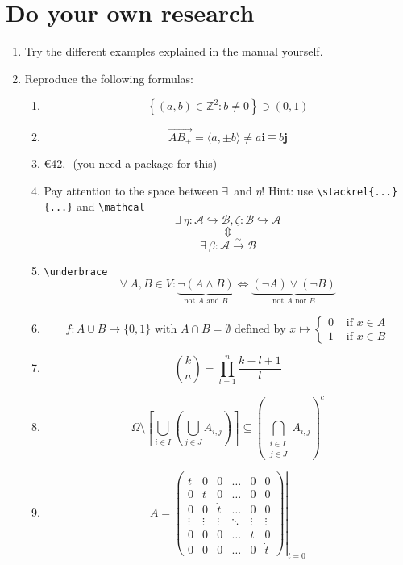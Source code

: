 \documentclass{article}
\begin{document}
\section{Do your own research}
\begin{enumerate}
	\item Try the different examples explained in the manual yourself.
	\item Reproduce the following formulas:
	\begin{enumerate}
		\item \[  \left\{(a,b) \in \mathbb{Z}^2 : b \neq 0\right\} \ni (0,1) \]
		\item \[\overrightarrow{AB_{\pm}} = \langle a, \pm b \rangle \neq a\mathbf{i} \mp b\mathbf{j}\]
		\item \euro 42,- (you need a package for this)
		\item Pay attention to the space between \textquotesingle\(\exists\)\textquotesingle \ and \textquotesingle\(\eta\)\textquotesingle! Hint: use \verb|\stackrel{...}{...}| and \verb.\mathcal.
			\[\exists \ \eta :\mathcal{A} \hookrightarrow \mathcal{B}, \zeta : \mathcal{B} \hookrightarrow \mathcal{A}\]
			\[\Updownarrow\]
			\[\exists \ \beta : \mathcal{A} \stackrel{\sim}{\longrightarrow} \mathcal{B}\]
		\item \verb+\underbrace+
			\[\forall \ A, B \in V :  \underbrace{\neg(A \wedge B)}_{\text{not } A \text{ and } B} \Longleftrightarrow \underbrace{(\neg A) \vee (\neg B)}_{\text{not } A \text{ nor } B}\]
		\item 			\[f : A \cup B \to \{0,1\} \text{ with } A \cap B = \emptyset \text{ defined by } x \mapsto \begin{cases} 0 & \text{ if } x \in A\\1 & \text{ if } x \in B \end{cases}\]
		\item 
			\[\binom{k}{n} = \prod_{l = 1}^n\frac{k-l+1}{l}\]
		\item	
			\[\Omega \setminus \left[\bigcup_{i \in I}\left(\bigcup_{j \in J} A_{i,j} \right)\right] \subseteq \left(\bigcap_{\begin{smallmatrix} i \in I \\ j \in J \end{smallmatrix}} A_{i,j}\right)^c\]
		\item
			\[A = \left.\left(
			\begin{array}{cccccc}
				\dot{t} 	& 0 		& 0		& \ldots 	& 0 		& 0\\
				0 		& t 		& 0		& \ldots 	& 0 		& 0\\
				0 		& 0 		& \dot{t} & \ldots 	& 0 		& 0\\
				\vdots 	& \vdots 	& \vdots 	& \ddots 	& \vdots 	& \vdots \\
				0 		& 0 		& 0 		& \ldots 	& t 		& 0\\
				0 		& 0 		& 0 		& \ldots 	& 0 		& \dot{t}
			\end{array}\right)\right|_{t = 0}\]
	\end{enumerate}
\end{enumerate}
\end{document}

